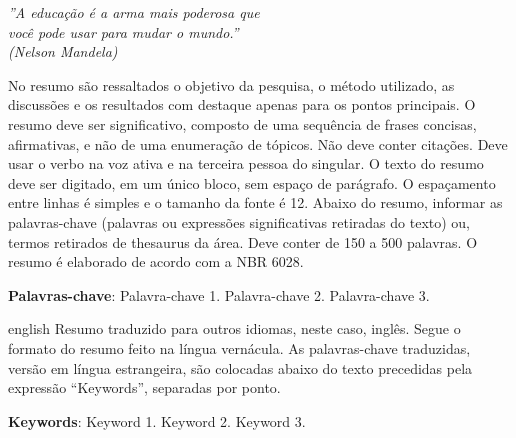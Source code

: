 \begin{epigrafe}
	\vspace*{\fill}
	\begin{flushright}
		\textit{''A educação é a arma mais poderosa que \\
            você pode usar para mudar o mundo.'' \\
            (Nelson Mandela)
            }
	\end{flushright}
\end{epigrafe}


\setlength{\absparsep}{18pt} %
\begin{resumo}
	\SingleSpacing
	No resumo são ressaltados o objetivo da pesquisa, o método utilizado, as discussões e os resultados com destaque apenas para os pontos principais. O resumo deve ser significativo, composto de uma sequência de frases concisas, afirmativas, e não de uma enumeração de tópicos. Não deve conter citações. Deve usar o verbo na voz ativa e na terceira pessoa do singular. O texto do resumo deve ser digitado, em um único bloco, sem espaço de parágrafo. O espaçamento entre linhas é simples e o tamanho da fonte é 12. Abaixo do resumo, informar as palavras-chave (palavras ou expressões significativas retiradas do texto) ou, termos retirados de thesaurus da área. Deve conter de 150 a 500 palavras. O resumo é elaborado de acordo com a NBR 6028.
	
	\textbf{Palavras-chave}: Palavra-chave 1. Palavra-chave 2. Palavra-chave 3.
\end{resumo}

\begin{resumo}[Abstract]
	\SingleSpacing
	\begin{otherlanguage*}{english}
		Resumo traduzido para outros idiomas, neste caso, inglês. Segue o formato do resumo feito na língua vernácula. As palavras-chave traduzidas, versão em língua estrangeira, são colocadas abaixo do texto precedidas pela expressão “Keywords”, separadas por ponto.
		
		\textbf{Keywords}: Keyword 1. Keyword 2. Keyword 3.
	\end{otherlanguage*}
\end{resumo}

% 
%
%  

